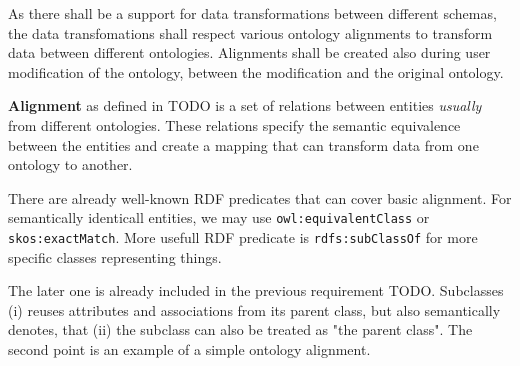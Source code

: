 \begin{requirement}
    As there shall be a support for data transformations between different schemas, the data transfomations shall respect various ontology alignments to transform data between different ontologies. Alignments shall be created also during user modification of the ontology, between the modification and the original ontology.
\end{requirement}

\textbf{Alignment} as defined in TODO is a set of relations between entities \textit{usually} from different ontologies. These relations specify the semantic equivalence between the entities and create a mapping that can transform data from one ontology to another.

There are already well-known RDF predicates that can cover basic alignment. For semantically identicall entities, we may use \verb|owl:equivalentClass| or \verb|skos:exactMatch|. More usefull RDF predicate is \verb|rdfs:subClassOf| for more specific classes representing things.

The later one is already included in the previous requirement TODO. Subclasses (i) reuses attributes and associations from its parent class, but also semantically denotes, that (ii) the subclass can also be treated as "the parent class". The second point is an example of a simple ontology alignment.

\begin{showcase}
\end{showcase}